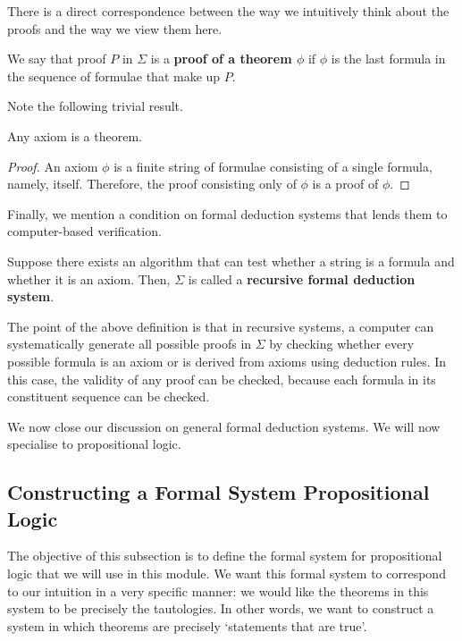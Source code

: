 There is a direct correspondence between the way we intuitively think about the proofs and the way we view them here.

\begin{boxconvention}
    We say that proof $P$ in $\Sigma$ is a \textbf{proof of a theorem $\phi$} if $\phi$ is the last formula in the sequence of formulae that make up $P$.
\end{boxconvention}

Note the following trivial result.

\begin{boxlemma}
    Any axiom is a theorem.
\end{boxlemma}
\begin{proof}
    An axiom $\phi$ is a finite string of formulae consisting of a single formula, namely, itself. Therefore, the proof consisting only of $\phi$ is a proof of $\phi$.
\end{proof}

Finally, we mention a condition on formal deduction systems that lends them to computer-based verification.

\begin{boxdefinition}
    Suppose there exists an algorithm that can test whether a string is a formula and whether it is an axiom. Then, $\Sigma$ is called a \textbf{recursive formal deduction system}.
\end{boxdefinition}

The point of the above definition is that in recursive systems, a computer can systematically generate all possible proofs in $\Sigma$ by checking whether every possible formula is an axiom or is derived from axioms using deduction rules. In this case, the validity of any proof can be checked, because each formula in its constituent sequence can be checked.

We now close our discussion on general formal deduction systems. We will now specialise to propositional logic.

\subsection{Constructing a Formal System Propositional Logic}

The objective of this subsection is to define the formal system for propositional logic that we will use in this module. We want this formal system to correspond to our intuition in a very specific manner: we would like the theorems in this system to be precisely the tautologies. In other words, we want to construct a system in which theorems are precisely `statements that are true'.

